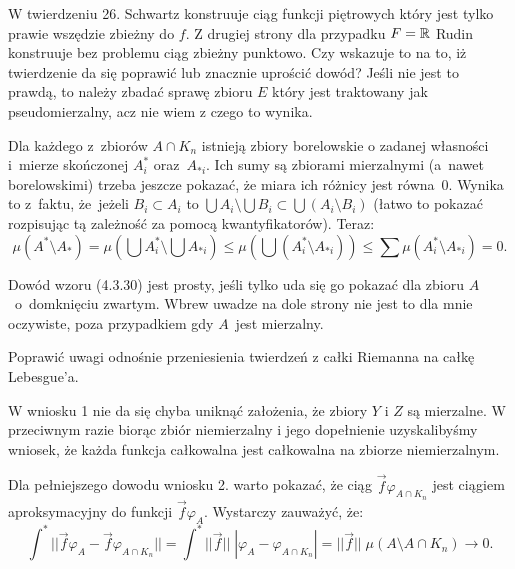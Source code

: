 \documentclass[a4paper,11pt]{article}
\begin{document}
\start {} W twierdzeniu 26. Schwartz konstruuje ciąg funkcji
piętrowych który jest tylko prawie wszędzie zbieżny do $f$. Z drugiej
strony dla przypadku $F = \mathbb{R}$ Rudin \cite{Rud86} konstruuje bez
problemu ciąg zbieżny punktowo. Czy wskazuje to na to, iż twierdzenie
da się poprawić lub znacznie uprościć dowód? Jeśli nie jest to prawdą,
to należy zbadać sprawę zbioru $E$ który jest traktowany jak
pseudomierzalny, acz nie wiem z czego to wynika.

\start {} Dla każdego z~zbiorów $A \cap K_{ n }$ istnieją
zbiory borelowskie o zadanej własności i~mierze skończonej
$A_{ i }^{ * }$ oraz~$A_{ * i }$. Ich sumy są zbiorami mierzalnymi
(a~nawet borelowskimi) trzeba jeszcze pokazać, że miara ich różnicy
jest równa~0. Wynika to z~faktu, że~jeżeli $B_{ i } \subset A_{ i }$
to
$\bigcup A_{ i } \setminus \bigcup B_{ i } \subset \bigcup ( A_{ i }
\setminus B_{ i } )$ (łatwo to pokazać rozpisując tą zależność za
pomocą kwantyfikatorów). Teraz:
\begin{displaymath}
  \mu( A^{ * } \setminus A_{ * } ) = \mu\left( \bigcup A^{ * }_{ i }
    \setminus \bigcup A_{ * i } \right) \leq \mu\left( \bigcup
    ( A^{ * }_{ i } \setminus A_{ * i } ) \right) \leq
  \sum \mu( A^{ * }_{ i } \setminus A_{ * i } ) = 0.
\end{displaymath}

\start {} Dowód wzoru (4.3.30) jest prosty, jeśli tylko uda się
go pokazać dla zbioru $A$~o~domknięciu zwartym. Wbrew uwadze na dole
strony nie jest to dla mnie oczywiste, poza przypadkiem gdy $A$~jest
mierzalny.

\start {} Poprawić uwagi odnośnie przeniesienia twierdzeń z
całki Riemanna na całkę Lebesgue'a.

\start {} W wniosku 1 nie da się chyba uniknąć założenia, że
zbiory $Y$ i $Z$ są mierzalne. W przeciwnym razie biorąc zbiór
niemierzalny i jego dopełnienie uzyskalibyśmy wniosek, że każda
funkcja całkowalna jest całkowalna na zbiorze niemierzalnym.

\start {} Dla pełniejszego dowodu wniosku 2. warto pokazać, że
ciąg $\vec{ f } \varphi_{ A \cap K_{ n } }$ jest ciągiem
aproksymacyjny do funkcji $\vec{ f } \varphi_{ A }$. Wystarczy
zauważyć, że:
\begin{displaymath}
  \int^{ * } || \vec{ f } \varphi_{ A } - \vec{ f }
  \varphi_{ A \cap K_{ n } } || = \int^{ * } || \vec{ f } || \;
  | \varphi_{ A } - \varphi_{ A \cap K_{ n } } | = || \vec{ f } || \;
  \mu( A \setminus A \cap K_{ n } ) \rightarrow 0.
\end{displaymath}
\end{document}
